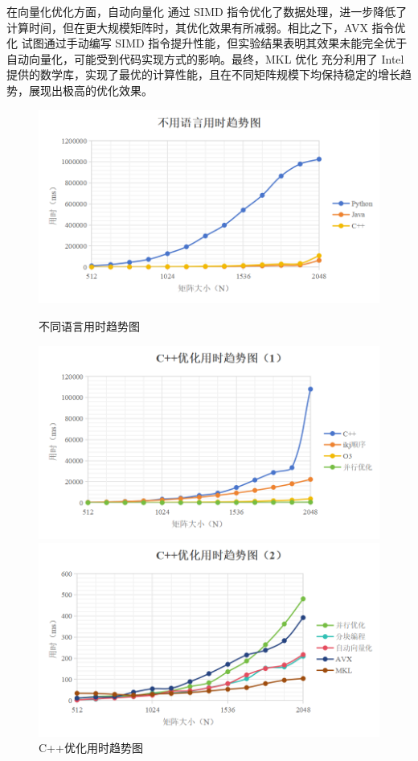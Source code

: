\documentclass[a4paper, utf8]{ctexart}
\begin{document}
	在向量化优化方面，自动向量化 通过 SIMD 指令优化了数据处理，进一步降低了计算时间，但在更大规模矩阵时，其优化效果有所减弱。相比之下，AVX 指令优化 试图通过手动编写 SIMD 指令提升性能，但实验结果表明其效果未能完全优于自动向量化，可能受到代码实现方式的影响。最终，MKL 优化 充分利用了 Intel 提供的数学库，实现了最优的计算性能，且在不同矩阵规模下均保持稳定的增长趋势，展现出极高的优化效果。
	
	\begin{figure}
		\begin{minipage}{.32\textwidth}
			\centering
			\includegraphics[height=.11\textheight]{./figure/Experience2_result1.png}
			\caption{不同语言用时趋势图}
		\end{minipage}
		\begin{minipage}{.32\textwidth}
			\centering
			\includegraphics[height=.11\textheight]{./figure/Experience2_result2.png}
			\caption{C++优化用时趋势图}
		\end{minipage}
		\begin{minipage}{.32\textwidth}
			\centering
			\includegraphics[height=.11\textheight]{./figure/Experience2_result3.png}

\end{minipage}
\end{figure}
\end{document}
